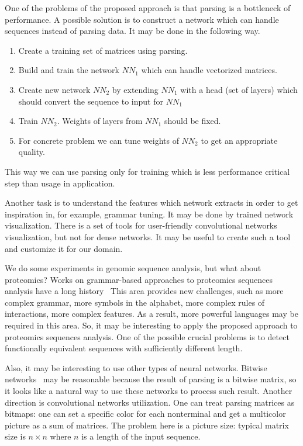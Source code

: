 \documentclass[a4paper,twoside]{article}
\begin{document}
One of the problems of the proposed approach is that parsing is a bottleneck of performance.
A possible solution is to construct a network which can handle sequences instead of parsing data.
It may be done in the following way.
\begin{enumerate}
\item Create a training set of matrices using parsing.
\item Build and train the network $NN_1$ which can handle vectorized matrices.
\item Create new network $NN_2$ by extending $NN_1$ with a head (set of layers) which should convert the sequence to input for $NN_1$
\item Train $NN_2$. Weights of layers from $NN_1$ should be fixed.
\item For concrete problem we can tune weights of $NN_2$ to get an appropriate quality.
\end{enumerate}
This way we can use parsing only for training which is less performance critical step than usage in application.

Another task is to understand the features which network extracts in order to get inspiration in, for example, grammar tuning.
It may be done by trained network visualization.
There is a set of tools for user-friendly convolutional networks visualization, but not for dense networks.
It may be useful to create such a tool and customize it for our domain.

We do some experiments in genomic sequence analysis, but what about proteomics?
Works on grammar-based approaches to proteomics sequences analysis have a long history~\cite{Jimenez-Montaño1984,Dyrka2008ASC,Sciacca2011AnnotatedSC}%
This area provides new challenges, such as more complex grammar, more symbols in the alphabet, more complex rules of interactions, more complex features.
As a result, more powerful languages may be required in this area.
So, it may be interesting to apply the proposed approach to proteomics sequences analysis.
One of the possible crucial problems is to detect functionally equivalent sequences with sufficiently different length.

Also, it may be interesting to use other types of neural networks.
Bitwise networks~\cite{DBLP:journals:corr:KimS16} may be reasonable because the result of parsing is a bitwise matrix, so it looks like a natural way to use these networks to process such result. 
Another direction is convolutional networks utilization.
One can treat parsing matrices as bitmaps: one can set a specific color for each nonterminal and get a multicolor picture as a sum of matrices.
The problem here is a picture size: typical matrix size is $n \times n$ where $n$ is a length of the input sequence.
\end{document}
